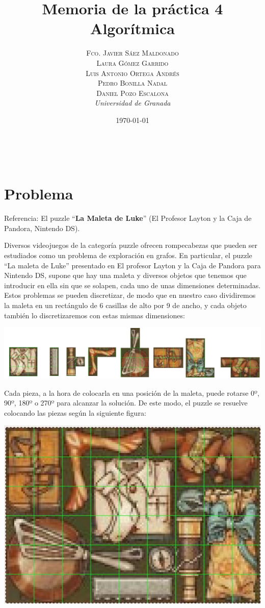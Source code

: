 \documentclass[a4paper, 11pt]{article}
\title{\textbf{Memoria de la práctica 4}\\ %
Algorítmica} %
\author{\textsc{Fco. Javier Sáez Maldonado}\\ %
\textsc{Laura Gómez Garrido}\\
\textsc{Luis Antonio Ortega Andrés}\\
\textsc{Pedro Bonilla Nadal}\\
\textsc{Daniel Pozo Escalona}\vspace{2cm}
\\{\textit{Universidad de Granada}}} %
\date{\today} %
\makeatletter
\renewcommand{\maketitle}{
  \begin{flushright} %
  
  {\LARGE\@title} %
  
  \vspace{50pt} %
  
  {\large\@author} %
  \\\@date %
  \vspace{40pt} %
  \end{flushright}
}
\makeatother
\begin{document}
\maketitle %


{\parskip=2pt
  \tableofcontents
}
\pagebreak



\section{Problema}
 Referencia: El puzzle “\textbf{La Maleta de Luke}” (El Profesor Layton y la Caja de
Pandora, Nintendo DS).


Diversos videojuegos de la categoría puzzle ofrecen rompecabezas que pueden
ser estudiados como un problema de exploración en grafos. En particular, el puzzle “La maleta de Luke” presentado en El profesor Layton y la Caja de Pandora para Nintendo DS, supone que hay una maleta y diversos objetos que tenemos que introducir en ella
sin que se solapen, cada uno de unas dimensiones determinadas.
Estos problemas se pueden discretizar, de modo que en nuestro caso dividiremos
la maleta en un rectángulo de 6 casillas de alto por 9 de ancho, y cada objeto también lo
discretizaremos con estas mismas dimensiones:\\
\begin{center}
	\includegraphics[scale=0.35]{piezas.png}
\end{center}

Cada pieza, a la hora de colocarla en una posición de la maleta, puede
rotarse 0º, 90º, 180º o 270º para alcanzar la solución. De este modo, el
puzzle se resuelve colocando las piezas según la siguiente figura:
\begin{center}
	\includegraphics[scale=0.35]{solucion.png}
\end{center}
\end{document}
